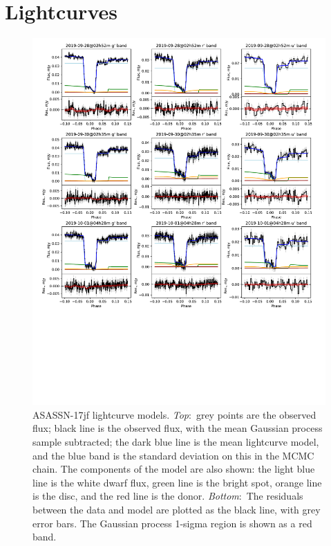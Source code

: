 \clearpage
\onecolumn
\section{Lightcurves}
\label{appendix:lightcurves}

\begin{figure}
    \centering
    \includegraphics[width=\columnwidth, trim={0 10cm 0 0}, clip]{figures/results/three_cvs_with_weird_colours/ASASSN-17jf/ASASSN-17jf_lightcurves_3.pdf}
    \caption{ASASSN-17jf lightcurve models. {\it Top}:~grey points are the observed flux; black line is the observed flux, with the mean Gaussian process sample subtracted; the dark blue line is the mean lightcurve model, and the blue band is the standard deviation on this in the MCMC chain. The components of the model are also shown: the light blue line is the white dwarf flux, green line is the bright spot, orange line is the disc, and the red line is the donor. {\it Bottom}:~The residuals between the data and model are plotted as the black line, with grey error bars. The Gaussian process 1-sigma region is shown as a red band.}
    \label{fig:ASASSN-17jf all lightcurves}
\end{figure}

